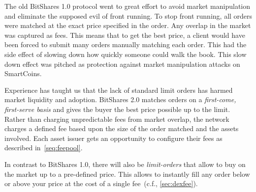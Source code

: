 The old BitShares 1.0 protocol went to great effort to avoid market
manipulation and eliminate the supposed evil of front running. To stop front
running, all orders were matched at the exact price specified in the order. Any
overlap in the market was captured as fees. This means that to get the best
price, a client would have been forced to submit many orders manually matching
each order. This had the side effect of slowing down how quickly someone could
walk the book. This slow down effect was pitched as protection against market
manipulation attacks on SmartCoins.

Experience has taught us that the lack of standard limit orders has harmed
market liquidity and adoption. BitShares 2.0 matches orders on a
\emph{first-come, first-serve basis} and gives the buyer the best price
possible up to the limit. Rather than charging unpredictable fees from market
overlap, the network charges a defined fee based upon the size of the order
matched and the assets involved. Each asset issuer gets an opportunity to
configure their fees as described in~\cref{seq:feepool}.

In contrast to BitShares 1.0, there will also be \emph{limit-orders} that allow
to buy on the market up to a pre-defined price. This allows to instantly fill
any order below or above your price at the cost of a single fee~(c.f.,
\cref{sec:dexfee}).
